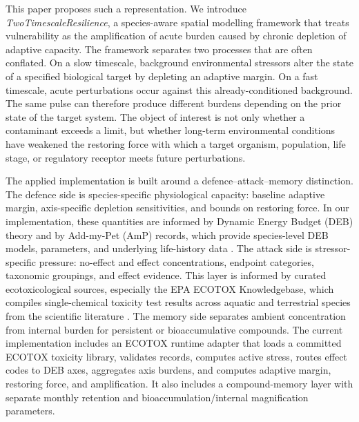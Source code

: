 This paper proposes such a representation. We introduce \emph{TwoTimescaleResilience}, a species-aware spatial modelling framework that treats vulnerability as the amplification of acute burden caused by chronic depletion of adaptive capacity. The framework separates two processes that are often conflated. On a slow timescale, background environmental stressors alter the state of a specified biological target by depleting an adaptive margin. On a fast timescale, acute perturbations occur against this already-conditioned background. The same pulse can therefore produce different burdens depending on the prior state of the target system. The object of interest is not only whether a contaminant exceeds a limit, but whether long-term environmental conditions have weakened the restoring force with which a target organism, population, life stage, or regulatory receptor meets future perturbations.

The applied implementation is built around a defence--attack--memory distinction. The defence side is species-specific physiological capacity: baseline adaptive margin, axis-specific depletion sensitivities, and bounds on restoring force. In our implementation, these quantities are informed by Dynamic Energy Budget (DEB) theory and by Add-my-Pet (AmP) records, which provide species-level DEB models, parameters, and underlying life-history data \citep{kooijman2010deb,marques2018amp}. The attack side is stressor-specific pressure: no-effect and effect concentrations, endpoint categories, taxonomic groupings, and effect evidence. This layer is informed by curated ecotoxicological sources, especially the EPA ECOTOX Knowledgebase, which compiles single-chemical toxicity test results across aquatic and terrestrial species from the scientific literature \citep{olker2022ecotox,epa2026ecotox}. The memory side separates ambient concentration from internal burden for persistent or bioaccumulative compounds. The current implementation includes an ECOTOX runtime adapter that loads a committed ECOTOX toxicity library, validates records, computes active stress, routes effect codes to DEB axes, aggregates axis burdens, and computes adaptive margin, restoring force, and amplification. It also includes a compound-memory layer with separate monthly retention and bioaccumulation/internal magnification parameters.

